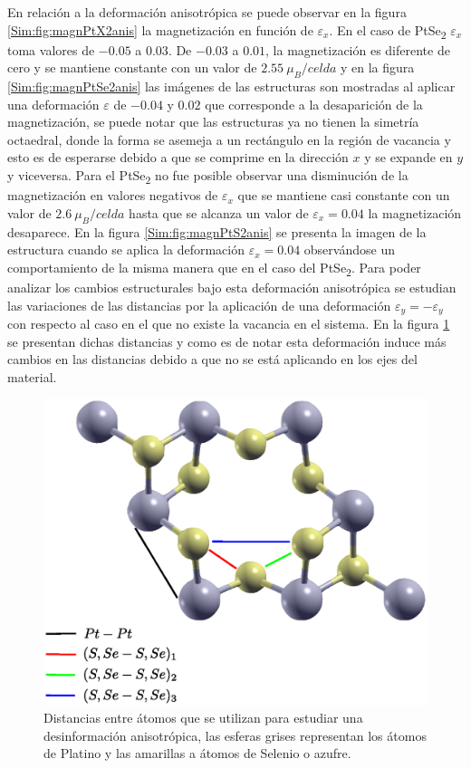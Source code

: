 \par En relaci\'on a la deformaci\'on anisotr\'opica se puede observar en la figura \ref{Sim:fig:magnPtX2anis} la magnetizaci\'on en  funci\'on de  $\varepsilon_x$. En el caso de PtSe\textsubscript{2} $\varepsilon_x$ toma valores de $-0.05$ a $0.03$. De $-0.03$ a $0.01$, la magnetizaci\'on es diferente de cero y se mantiene constante con un valor de $2.55 ~\mu_{B}/celda$ y  en la figura \ref{Sim:fig:magnPtSe2anis} las im\'agenes de las estructuras son mostradas al aplicar una deformaci\'on $\varepsilon$ de $-0.04$ y $0.02$ que corresponde a la desaparici\'on de la magnetizaci\'on, se puede notar que las estructuras ya no tienen la simetr\'ia octaedral, donde la forma se asemeja a un rect\'angulo en la regi\'on de vacancia y esto es de  esperarse debido a que se comprime en la direcci\'on $x$ y se expande en $y$ y viceversa. Para el PtSe\textsubscript{2} no fue posible observar una disminuci\'on de la magnetizaci\'on en valores negativos de $\varepsilon_x$ que se mantiene casi constante con un valor de $2.6 ~\mu_{B}/celda$ hasta que se alcanza un valor de $\varepsilon_x=0.04$ la magnetizaci\'on desaparece. En la figura \ref{Sim:fig:magnPtS2anis} se presenta la imagen de la estructura cuando se aplica la deformaci\'on $\varepsilon_x=0.04$ observ\'andose un comportamiento de la misma manera que en el caso del PtSe\textsubscript{2}. Para poder analizar los cambios estructurales bajo esta deformaci\'on anisotr\'opica se estudian las variaciones de las distancias por la aplicaci\'on de una deformaci\'on $\varepsilon_y =-\varepsilon_y$ con respecto al caso en el que no existe la vacancia en el sistema. En la figura \ref{Sim:fig:defAnisPtX2} se presentan dichas distancias y como es de notar esta deformaci\'on induce m\'as cambios en las distancias debido a que no se est\'a aplicando en los ejes del material. 
\begin{figure}[!hbt]
	\centering
	\includegraphics[scale=0.3]{figRes/compAnisDef.eps}
	\caption[Estudio de distancias en sistemas con Platino y una vacancia bajo una deformaci\'on anisotr\'opica]{Distancias entre \'atomos que se utilizan para estudiar una desinformación anisotr\'opica, las esferas grises representan los \'atomos de Platino y las amarillas a \'atomos de Selenio o  azufre. }
	\label{Sim:fig:defAnisPtX2}
\end{figure}

